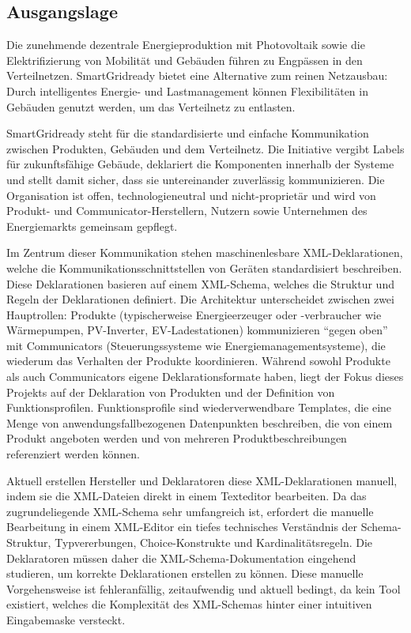 \documentclass[a4paper,12pt]{article}
\begin{document}
\subsection{Ausgangslage}

Die zunehmende dezentrale Energieproduktion mit Photovoltaik sowie die Elektrifizierung von Mobilität und 
Gebäuden führen zu Engpässen in den Verteilnetzen. SmartGridready bietet eine Alternative zum reinen 
Netzausbau: Durch intelligentes Energie- und Lastmanagement können Flexibilitäten in Gebäuden genutzt werden, 
um das Verteilnetz zu entlasten.

SmartGridready steht für die standardisierte und einfache Kommunikation zwischen Produkten, Gebäuden und dem 
Verteilnetz. Die Initiative vergibt Labels für zukunftsfähige Gebäude, deklariert die Komponenten innerhalb 
der Systeme und stellt damit sicher, dass sie untereinander zuverlässig kommunizieren. Die Organisation ist 
offen, technologieneutral und nicht-proprietär und wird von Produkt- und Communicator-Herstellern, Nutzern 
sowie Unternehmen des Energiemarkts gemeinsam gepflegt.

Im Zentrum dieser Kommunikation stehen maschinenlesbare XML-Deklarationen, welche die Kommunikationsschnittstellen 
von Geräten standardisiert beschreiben. Diese Deklarationen basieren auf einem XML-Schema, welches die Struktur 
und Regeln der Deklarationen definiert. Die Architektur unterscheidet zwischen zwei Hauptrollen: Produkte 
(typischerweise Energieerzeuger oder -verbraucher wie Wärmepumpen, PV-Inverter, EV-Ladestationen) kommunizieren 
``gegen oben'' mit Communicators (Steuerungssysteme wie Energiemanagementsysteme), die wiederum das Verhalten 
der Produkte koordinieren. Während sowohl Produkte als auch Communicators eigene Deklarationsformate haben, 
liegt der Fokus dieses Projekts auf der Deklaration von Produkten und der Definition von Funktionsprofilen. 
Funktionsprofile sind wiederverwendbare Templates, die eine Menge von anwendungsfallbezogenen Datenpunkten 
beschreiben, die von einem Produkt angeboten werden und von mehreren Produktbeschreibungen referenziert werden 
können.

Aktuell erstellen Hersteller und Deklaratoren diese XML-Deklarationen manuell, indem sie die XML-Dateien direkt 
in einem Texteditor bearbeiten. Da das zugrundeliegende XML-Schema sehr umfangreich ist, erfordert die manuelle 
Bearbeitung in einem XML-Editor ein tiefes technisches Verständnis der Schema-Struktur, Typvererbungen, 
Choice-Konstrukte und Kardinalitätsregeln. Die Deklaratoren müssen daher die XML-Schema-Dokumentation eingehend 
studieren, um korrekte Deklarationen erstellen zu können. Diese manuelle Vorgehensweise ist fehleranfällig, 
zeitaufwendig und aktuell bedingt, da kein Tool existiert, welches die Komplexität des XML-Schemas hinter einer 
intuitiven Eingabemaske versteckt.
\end{document}
